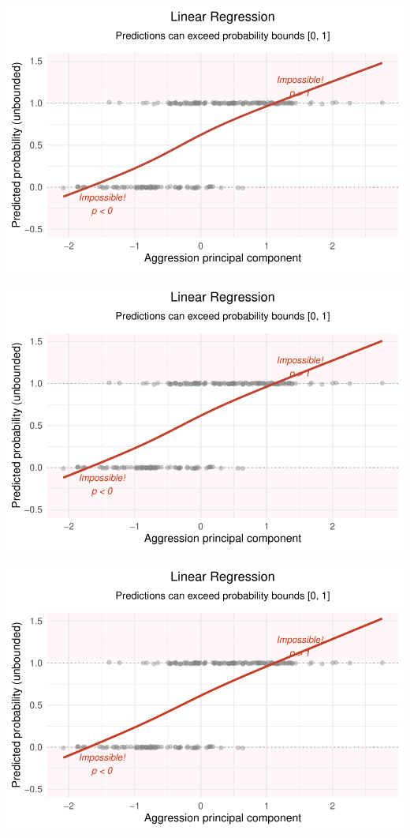 \documentclass[
  letterpaper,
  DIV=11,
  numbers=noendperiod]{scrartcl}
\begin{document}
\begin{center}
\includegraphics[width=0.8\linewidth,height=\textheight,keepaspectratio]{Beyond!!!_files/figure-pdf/unnamed-chunk-4-90.pdf}
\end{center}

\begin{center}
\includegraphics[width=0.8\linewidth,height=\textheight,keepaspectratio]{Beyond!!!_files/figure-pdf/unnamed-chunk-4-91.pdf}
\end{center}

\begin{center}
\includegraphics[width=0.8\linewidth,height=\textheight,keepaspectratio]{Beyond!!!_files/figure-pdf/unnamed-chunk-4-92.pdf}
\end{center}
\end{document}
